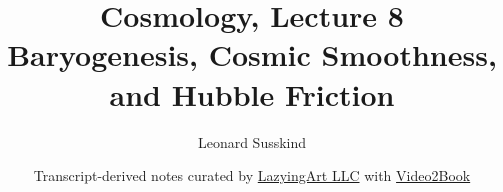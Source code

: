 \documentclass[11pt,oneside]{book}
\begin{document}
\hypersetup{pageanchor=false}
\frontmatter
\title{Cosmology, Lecture 8\\Baryogenesis, Cosmic Smoothness, and Hubble Friction}
\author{Leonard Susskind}
\date{Transcript-derived notes curated by \href{https://lazying.art}{LazyingArt LLC} with \href{https://github.com/lachlanchen/Video2Book}{Video2Book}}
\maketitle
\clearpage
\hypersetup{pageanchor=true}
\mainmatter

\end{document}
